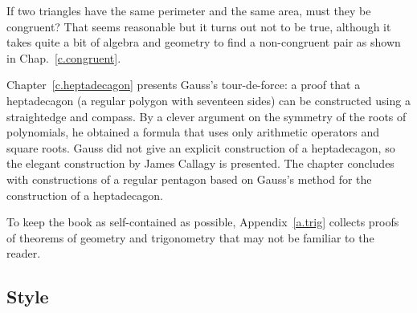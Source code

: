 If two triangles have the same perimeter and the same area, must they be congruent? That seems reasonable but it turns out not to be true, although it takes quite a bit of algebra and geometry to find a non-congruent pair as shown in Chap.~\ref{c.congruent}.

Chapter~\ref{c.heptadecagon} presents Gauss's tour-de-force: a proof that a heptadecagon (a regular polygon with seventeen sides) can be constructed using a straightedge and compass. By a clever argument on the symmetry of the roots of polynomials, he obtained a formula that uses only arithmetic operators and square roots. Gauss did not give an explicit construction of a heptadecagon, so the elegant construction by James Callagy is presented. The chapter concludes with constructions of a regular pentagon based on Gauss's method for the construction of a heptadecagon.

To keep the book as self-contained as possible, Appendix~\ref{a.trig} collects proofs of theorems of geometry and trigonometry that may not be familiar to the reader.

\subsection*{Style}

